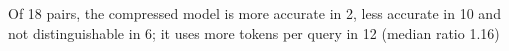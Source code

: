 Of 18 pairs, the compressed model is more accurate in 2, less accurate in 10 and not distinguishable in 6; it uses more tokens per query in 12 (median ratio 1.16)%
